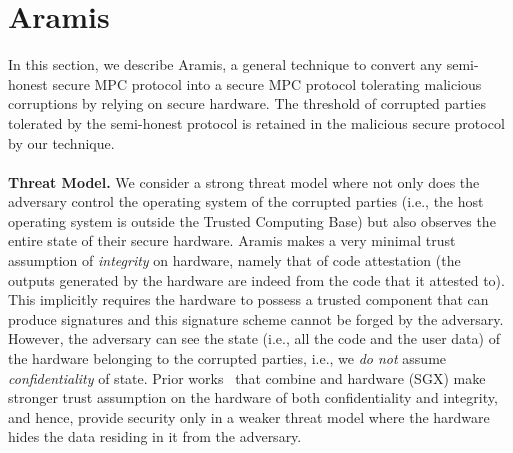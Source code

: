 \section{Aramis}\label{sec:aramis}

In this section, we describe Aramis, a general technique to convert
any semi-honest secure MPC
protocol into a secure MPC protocol tolerating malicious
corruptions by relying on secure hardware. The threshold of corrupted parties tolerated by the
semi-honest protocol is retained in the malicious
secure protocol by our technique. 
\\\\
\noindent\textbf{Threat Model.} We consider a strong threat model where not only does the adversary control the operating system of the corrupted parties 
(i.e., the host operating system is outside the Trusted Computing Base)
but also observes the entire state of their secure hardware.
Aramis makes a very minimal
trust assumption of {\em integrity} on
hardware, namely that of code attestation (the outputs generated by the hardware are indeed from the code that it attested to).
This implicitly requires
the hardware to possess a trusted component that can produce
signatures and this signature scheme cannot be forged
by the adversary. 
However, the adversary can see the state  (i.e., all the code and the user data) of the hardware belonging to the corrupted parties, i.e., we {\em do not} assume {\em confidentiality} of state.
Prior works~\cite{vc3, obliviousmpml, GuptaFC16, BahmaniFC17,gcsgx,ndss1,ndss2,ndss3,slalom,opaque,chiron} that combine \mpc and hardware (SGX)  make stronger trust assumption on the hardware of both confidentiality and integrity,
 and hence, provide security only in a weaker threat model where the hardware hides the data residing in it from the adversary. 
\\\\
